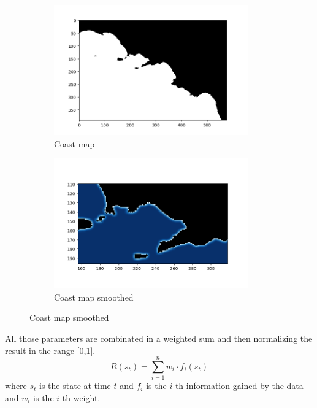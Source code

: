 \documentclass[journal,article,submit,pdftex,moreauthors]{Definitions/mdpi}
\begin{document}
\begin{figure}[h]
	\begin{subfigure}{0.5\textwidth}
		\centering
		\includegraphics[width=\textwidth]{res/imgs/coast.png}
		\caption{Coast map}
		\label{fig:coast}
	\end{subfigure}
	\begin{subfigure}{0.5\textwidth}
		\centering
		\includegraphics[width=\textwidth]{res/imgs/coastBlur.png}
		\caption{Coast map smoothed}
		\label{fig:coastBlur}
	\end{subfigure}
\end{figure}

All those parameters are combinated in a weighted sum and then normalizing the result in the range [0,1].\\
\begin{equation}
\label{eq:reward}
R(s_t) = \sum_{i=1}^n w_i \cdot f_i(s_t)
\end{equation}
where $s_t$ is the state at time $t$ and $f_i$ is the $i$-th information gained by the data and $w_i$ is the $i$-th weight.\\
\end{document}
